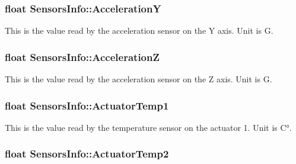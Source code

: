 \subsubsection[{\texorpdfstring{AccelerationY}{AccelerationY}}]{\setlength{\rightskip}{0pt plus 5cm}float Sensors\+Info\+::\+AccelerationY}\hypertarget{struct_sensors_info_af8316a86022a11ef16181d5cbc6e266e}{}\label{struct_sensors_info_af8316a86022a11ef16181d5cbc6e266e}


This is the value read by the acceleration sensor on the Y axis. Unit is G. 

\subsubsection[{\texorpdfstring{AccelerationZ}{AccelerationZ}}]{\setlength{\rightskip}{0pt plus 5cm}float Sensors\+Info\+::\+AccelerationZ}\hypertarget{struct_sensors_info_a98074de49d42dbb1b303e5e68e03cc90}{}\label{struct_sensors_info_a98074de49d42dbb1b303e5e68e03cc90}


This is the value read by the acceleration sensor on the Z axis. Unit is G. 

\subsubsection[{\texorpdfstring{Actuator\+Temp1}{ActuatorTemp1}}]{\setlength{\rightskip}{0pt plus 5cm}float Sensors\+Info\+::\+Actuator\+Temp1}\hypertarget{struct_sensors_info_a9aa0da9e61455fd8b3faa91ad5970985}{}\label{struct_sensors_info_a9aa0da9e61455fd8b3faa91ad5970985}


This is the value read by the temperature sensor on the actuator 1. Unit is C°. 

\subsubsection[{\texorpdfstring{Actuator\+Temp2}{ActuatorTemp2}}]{\setlength{\rightskip}{0pt plus 5cm}float Sensors\+Info\+::\+Actuator\+Temp2}\hypertarget{struct_sensors_info_abf182850e94b2bab72a282eb2a76be75}{}\label{struct_sensors_info_abf182850e94b2bab72a282eb2a76be75}


